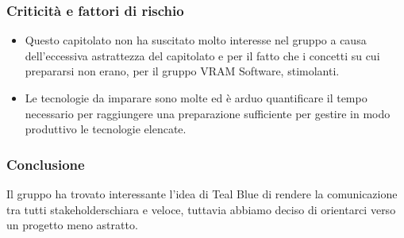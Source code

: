 \subsubsection{Criticità e fattori di rischio}
\begin{itemize}
	\item Questo capitolato non ha suscitato molto interesse nel gruppo a causa dell'eccessiva astrattezza del capitolato e per il fatto che i concetti su cui prepararsi non erano, per il gruppo VRAM Software, stimolanti. 
	\item Le tecnologie da imparare sono molte ed è arduo quantificare il tempo necessario per raggiungere una preparazione sufficiente per gestire in modo produttivo le tecnologie elencate.
\end{itemize}
\subsubsection{Conclusione}
Il gruppo ha trovato interessante l'idea di Teal Blue di rendere la comunicazione tra tutti stakeholders\glosp chiara e veloce, tuttavia abbiamo deciso di orientarci verso un progetto meno astratto.
